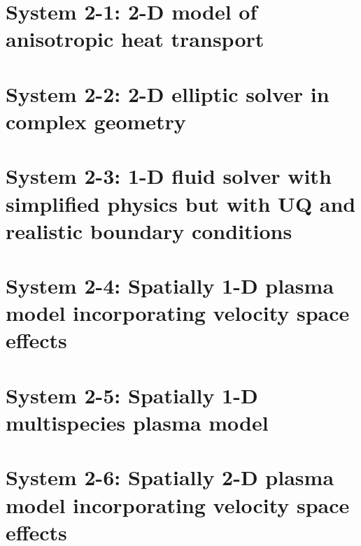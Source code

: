 \documentclass[11pt,twoside,a4paper]{article}
\begin{document}
\section{System 2-1: 2-D model of anisotropic heat transport} \label{sec:sys2-1}

\clearpage
\section{System 2-2: 2-D elliptic solver in complex geometry} \label{sec:sys2-2}

\clearpage
\section{System 2-3: 1-D fluid solver with simplified physics but with UQ and realistic boundary conditions} \label{sec:sys2-3}

\clearpage
\section{System 2-4: Spatially 1-D plasma model incorporating velocity space effects} \label{sec:sys2-4}

\clearpage
\section{System 2-5: Spatially 1-D multispecies plasma model} \label{sec:sys2-5}

\clearpage
\section{System 2-6: Spatially 2-D plasma model incorporating velocity space effects} \label{sec:sys2-6}

%
%
\clearpage
\end{document}
